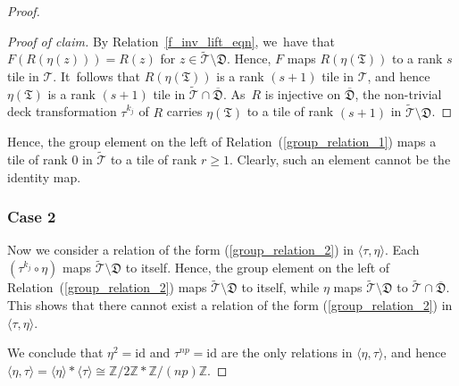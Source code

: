 \documentclass[JEP,XML,SOM,Unicode,NoFloatCountersInSection,published]{cedram}
\theoremstyle{definition}
\theoremstyle{remark}
\newcommand{\Z}{\mathbb{Z}}
\newcommand{\cT}{\mathcal{T}}
\begin{document}
\begin{proof}
\begin{proof}[Proof of claim]
By Relation~\eqref{f_inv_lift_eqn}, we~have that $F(R(\eta(z)))=R(z)$ for $z\in\widetilde{\cT}\setminus\mathfrak{D}$. Hence, $F$ maps $R(\eta(\mathfrak{T}))$ to a rank $s$ tile in $\cT$. It~follows that $R(\eta(\mathfrak{T}))$ is a rank $(s+1)$ tile in $\cT$, and hence $\eta(\mathfrak{T})$ is a rank $(s+1)$ tile in $\widetilde{\cT}\cap\overline{\mathfrak{D}}$. As~$R$ is injective on $\overline{\mathfrak{D}}$, the non-trivial deck transformation $\tau^{k_j}$ of $R$ carries $\eta(\mathfrak{T})$ to a tile of rank $(s+1)$ in $\widetilde{\mathcal{T}}\setminus \mathfrak{D}$.
\end{proof}

Hence, the group element on the left of Relation~(\ref{group_relation_1}) maps a tile of rank $0$ in $\widetilde{\cT}$ to a tile of rank $r\geq 1$. Clearly, such an element cannot be the identity map.

\subsubsection*{Case 2}
Now we consider a relation of the form (\ref{group_relation_2}) in $\langle\tau,\eta\rangle$. Each $(\tau^{k_j}\circ\eta)$ maps $\widetilde{\mathcal{T}}\setminus\mathfrak{D}$ to itself. Hence, the group element on the left of Relation~(\ref{group_relation_2}) maps $\widetilde{\mathcal{T}}\setminus\mathfrak{D}$ to itself, while $\eta$ maps $\widetilde{\mathcal{T}}\setminus\mathfrak{D}$ to $\widetilde{\mathcal{T}}\cap\overline{\mathfrak{D}}$. This shows that there cannot exist a relation of the form (\ref{group_relation_2}) in $\langle\tau,\eta\rangle$.

We conclude that $\eta^{2}=\mathrm{id}$ and $\tau^{np}=\mathrm{id}$ are the only relations in $\langle\eta,\tau\rangle$, and hence $\langle\eta,\tau\rangle=\langle\eta\rangle\ast\langle\tau\rangle\cong\Z/2\Z\ast\Z/(np)\Z$.
\end{proof}

\label{lifted_tiling_quotient_subsubsec}
\end{document}
